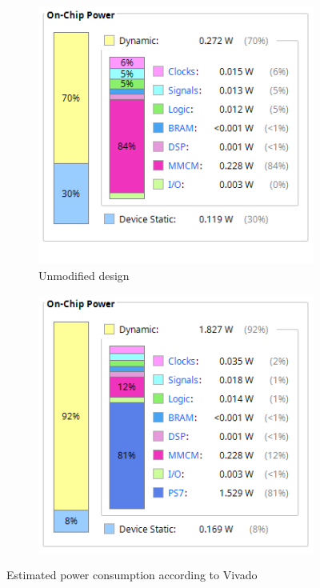\documentclass[../bachelor_paper.tex]{subfiles}
\begin{document}
\begin{figure}
    \centering
    \begin{subfigure}{0.45\textwidth}
        \includegraphics[width=\textwidth]{img/unmodified_power}
        \caption{Unmodified design}
        \label{fig:perf/power/split/unmod}
    \end{subfigure}
    \hfil
    \begin{subfigure}{0.45\textwidth}
        \includegraphics[width=\textwidth]{img/modified_power}
        \label{fig:perf/power/split/mod}
    \end{subfigure}
    \caption{Estimated power consumption according to Vivado}
    \label{fig:perf/power/split}
\end{figure}

\isstandalone



\fi
\end{document}
